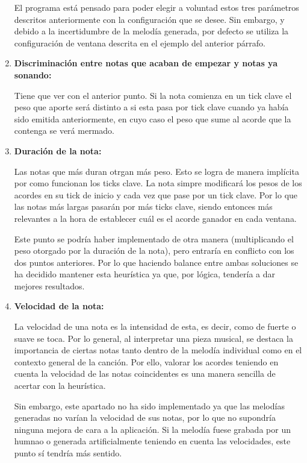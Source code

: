 \begin{enumerate}
    El programa está pensado para poder elegir a voluntad estos tres parámetros descritos anteriormente con la configuración que se desee. Sin embargo, y debido a la incertidumbre de la melodía generada, por defecto se utiliza la configuración de ventana descrita en el ejemplo del anterior párrafo.

    \item[\textbullet] \textbf{Discriminación entre notas que acaban de empezar y notas ya sonando:}

    Tiene que ver con el anterior punto. Si la nota comienza en un tick clave el peso que aporte será distinto a si esta pasa por tick clave cuando ya había sido emitida anteriormente, en cuyo caso el peso que sume al acorde que la contenga se verá mermado.

    \item[\textbullet] \textbf{Duración de la nota:}

    Las notas que más duran otrgan más peso. Esto se logra de manera implícita por como funcionan los ticks clave. La nota simpre modificará los pesos de los acordes en su tick de inicio y cada vez que pase por un tick clave. Por lo que las notas más largas pasarán por más ticks clave, siendo entonces más relevantes a la hora de establecer cuál es el acorde ganador en cada ventana.

    Este punto se podría haber implementado de otra manera (multiplicando el peso otorgado por la duración de la nota), pero entraría en conflicto con los dos puntos anteriores. Por lo que haciendo balance entre ambas soluciones se ha decidido mantener esta heurística ya que, por lógica, tendería a dar mejores resultados.

    \item[\textbullet] \textbf{Velocidad de la nota:}

    La velocidad de una nota es la intensidad de esta, es decir, como de fuerte o suave se toca. Por lo general, al interpretar una pieza musical, se destaca la importancia de ciertas notas tanto dentro de la melodía individual como en el contexto general de la canción. Por ello, valorar los acordes teniendo en cuenta la velocidad de las notas coincidentes es una manera sencilla de acertar con la heurística.

    Sin embargo, este apartado no ha sido implementado ya que las melodías generadas no varían la velocidad de sus notas, por lo que no supondría ninguna mejora de cara a la aplicación. Si la melodía fuese grabada por un humnao o generada artificialmente teniendo en cuenta las velocidades, este punto sí tendría más sentido.

\end{enumerate}

